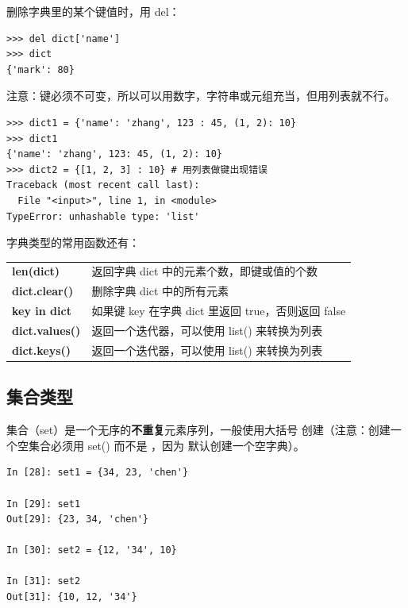 删除字典里的某个键值时，用 del：

\begin{lstlisting}[Language=Python]
>>> del dict['name']
>>> dict
{'mark': 80}
\end{lstlisting}

注意：键必须不可变，所以可以用数字，字符串或元组充当，但用列表就不行。

\begin{lstlisting}[Language=Python]
>>> dict1 = {'name': 'zhang', 123 : 45, (1, 2): 10}
>>> dict1
{'name': 'zhang', 123: 45, (1, 2): 10}
>>> dict2 = {[1, 2, 3] : 10} # 用列表做键出现错误
Traceback (most recent call last):
  File "<input>", line 1, in <module>
TypeError: unhashable type: 'list'
\end{lstlisting}


字典类型的常用函数还有：
\begin{center}
\begin{tcolorbox} [title = 字典类型的一些处理函数]
  \bf
  \begin{tcboutputlisting}
  \begin{tabular}{>{\bfseries}ll}
    len(dict) &返回字典 dict 中的元素个数，即键或值的个数\\
    dict.clear() &删除字典 dict 中的所有元素\\
    key in dict & 如果键 key 在字典 dict 里返回 true，否则返回 false\\
    dict.values() & 返回一个迭代器，可以使用 list() 来转换为列表\\
  dict.keys()  & 返回一个迭代器，可以使用 list() 来转换为列表
  \end{tabular}
\end{tcboutputlisting}
\end{tcolorbox}
\end{center}


\subsection{集合类型}

集合（set）是一个无序的\textbf{不重复}元素序列，一般使用大括号 { } 创建（注意：创建一个空集合必须用 set() 而不是 { }，因为 { } 默认创建一个空字典）。

\begin{lstlisting}[Language=Python]
In [28]: set1 = {34, 23, 'chen'}

In [29]: set1
Out[29]: {23, 34, 'chen'}

In [30]: set2 = {12, '34', 10}

In [31]: set2
Out[31]: {10, 12, '34'}
\end{lstlisting}

